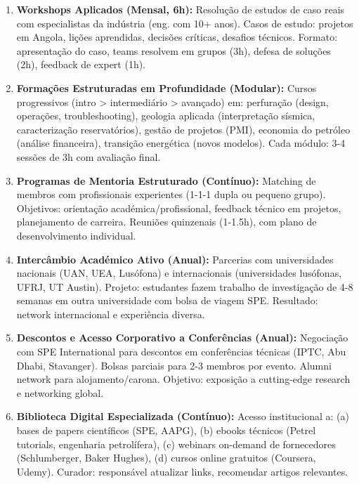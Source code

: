 \documentclass[12pt,a4paper]{article}
\begin{document}
\begin{enumerate}[itemsep=0.25cm]
    \item \textbf{Workshops Aplicados (Mensal, 6h):} Resolução de estudos de caso reais com especialistas da indústria (eng. com 10+ anos). Casos de estudo: projetos em Angola, lições aprendidas, decisões críticas, desafios técnicos. Formato: apresentação do caso, teams resolvem em grupos (3h), defesa de soluções (2h), feedback de expert (1h).
    
    \item \textbf{Formações Estruturadas em Profundidade (Modular):} Cursos progressivos (intro > intermediário > avançado) em: perfuração (design, operações, troubleshooting), geologia aplicada (interpretação sísmica, caracterização reservatórios), gestão de projetos (PMI), economia do petróleo (análise financeira), transição energética (novos modelos). Cada módulo: 3-4 sessões de 3h com avaliação final.
    
    \item \textbf{Programas de Mentoria Estruturado (Contínuo):} Matching de membros com profissionais experientes (1-1-1 dupla ou pequeno grupo). Objetivos: orientação académica/profissional, feedback técnico em projetos, planejamento de carreira. Reuniões quinzenais (1-1.5h), com plano de desenvolvimento individual.
    
    \item \textbf{Intercâmbio Académico Ativo (Anual):} Parcerias com universidades nacionais (UAN, UEA, Lusófona) e internacionais (universidades lusófonas, UFRJ, UT Austin). Projeto: estudantes fazem trabalho de investigação de 4-8 semanas em outra universidade com bolsa de viagem SPE. Resultado: network internacional e experiência diversa.
    
    \item \textbf{Descontos e Acesso Corporativo a Conferências (Anual):} Negociação com SPE International para descontos em conferências técnicas (IPTC, Abu Dhabi, Stavanger). Bolsas parciais para 2-3 membros por evento. Alumni network para alojamento/carona. Objetivo: exposição a cutting-edge research e networking global.
    
    \item \textbf{Biblioteca Digital Especializada (Contínuo):} Acesso institucional a: (a) bases de papers científicos (SPE, AAPG), (b) ebooks técnicos (Petrel tutorials, engenharia petrolífera), (c) webinars on-demand de fornecedores (Schlumberger, Baker Hughes), (d) cursos online gratuitos (Coursera, Udemy). Curador: responsável atualizar links, recomendar artigos relevantes.
    

\end{enumerate}
\end{document}
